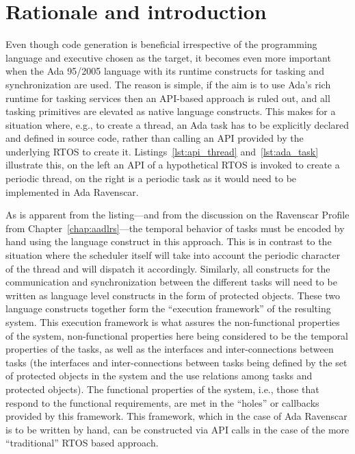 \section{Rationale and introduction}
Even though code generation is beneficial irrespective of the
programming language and executive chosen as the target, it becomes
even more important when the Ada 95/2005 language with its runtime
constructs for tasking and synchronization are used. The reason is
simple, if the aim is to use Ada's rich runtime for tasking services
then an API-based approach is ruled out, and all tasking primitives
are elevated as native language constructs. This makes for a situation
where, e.g., to create a thread, an Ada task has to be explicitly
declared and defined in source code, rather than calling an API
provided by the underlying RTOS to create
it. Listings~\ref{lst:api_thread} and~\ref{lst:ada_task} illustrate
this, on the left an API of a hypothetical RTOS is invoked to create a
periodic thread, on the right is a periodic task as it would need to
be implemented in Ada Ravenscar.

As is apparent from the listing---and from the discussion on the
Ravenscar Profile from Chapter~\ref{chap:aadlrs}---the temporal
behavior of tasks must be encoded by hand using the language construct
 in this approach. This is in contrast to the
situation where the scheduler itself will take into account the
periodic character of the thread and will dispatch it
accordingly. Similarly, all constructs for the communication and
synchronization between the different tasks will need to be written as
language level constructs in the form of protected objects. These two
language constructs together form the ``execution framework'' of the
resulting system. This execution framework is what assures the
non-functional properties of the system, non-functional properties
here being considered to be the temporal properties of the tasks, as
well as the interfaces and inter-connections between tasks (the
interfaces and inter-connections between tasks being defined by the
set of protected objects in the system and the use relations among
tasks and protected objects). The functional properties of the system,
i.e., those that respond to the functional requirements, are met in
the ``holes'' or callbacks provided by this framework. This framework,
which in the case of Ada Ravenscar is to be written by hand, can be
constructed via API calls in the case of the more ``traditional'' RTOS
based approach.


